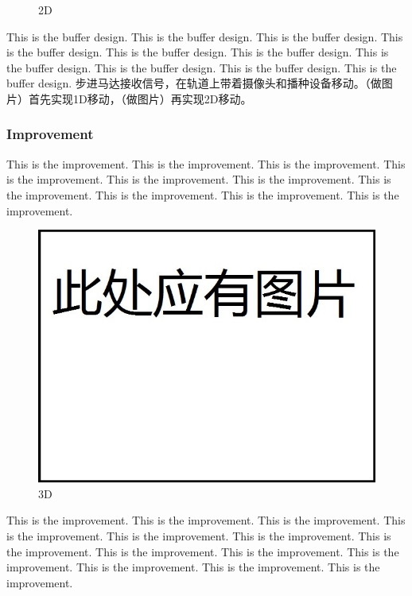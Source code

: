 \documentclass[12pt]{article}
\begin{document}
\begin{flushleft}
\begin{figure}[h!]
\begin{center}
		\caption{2D}
	\end{center}
\end{figure}
This is the buffer design. This is the buffer design. This is the buffer design. This is the buffer design. This is the buffer design. This is the buffer design. This is the buffer design. This is the buffer design. This is the buffer design. This is the buffer design. 
步进马达接收信号，在轨道上带着摄像头和播种设备移动。（做图片）首先实现1D移动，（做图片）再实现2D移动。

\subsubsection{Improvement}
This is the improvement. This is the improvement. This is the improvement. This is the improvement. This is the improvement. This is the improvement. This is the improvement. This is the improvement. This is the improvement. This is the improvement. 
\begin{figure}[h!]
	\begin{center}
		\includegraphics[scale = 0.6]{3D.jpg}
		\caption{3D}
	\end{center}
\end{figure}
This is the improvement. This is the improvement. This is the improvement. This is the improvement. This is the improvement. This is the improvement. This is the improvement. This is the improvement. This is the improvement. This is the improvement. This is the improvement. This is the improvement. This is the improvement. 
\begin{figure}[h!]

\end{figure}
\end{flushleft}
\end{document}
